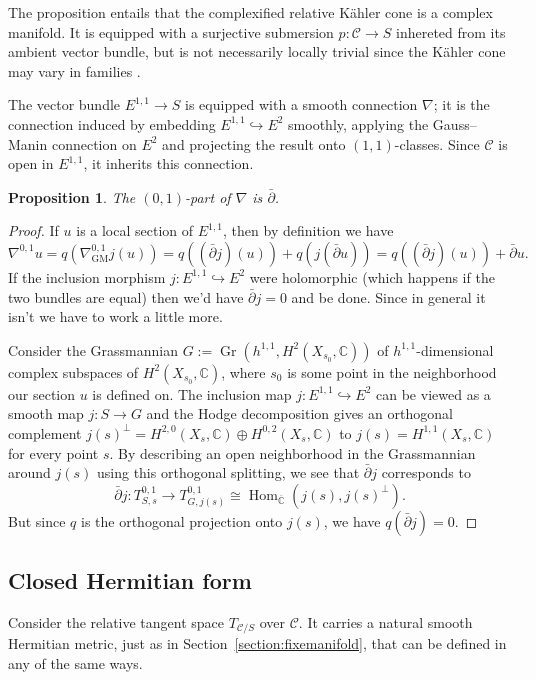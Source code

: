 \documentclass[11pt,a4paper]{amsart}
\newtheorem{prop}[theo]{Proposition}
\theoremstyle{definition}
\theoremstyle{remark}
\newcommand{\CC}{\mathbb{C}}
\def\ov#1{\overline{#1}}
\DeclareMathOperator{\Gr}{Gr}
\DeclareMathOperator{\Hom}{Hom}
\def\dbar{\bar\partial}
\def\conn{\nabla}
\def\conngm{\nabla_{\mathrm{GM}}}
\def\KC{C}
\def\RKC{\mathcal{\KC}}
\begin{document}
The proposition entails that the complexified relative K\"{a}hler cone is
a complex manifold. It is equipped with a surjective submersion $p :
\RKC \to S$ inhereted from its ambient vector bundle, but is not
necessarily locally trivial since the K\"{a}hler cone may vary in
families
\cite{DemaillyPaun}.


The vector bundle $E^{1,1} \to S$ is equipped with a smooth connection
$\conn$; it is the connection induced by embedding $E^{1,1}
\hookrightarrow E^2$ smoothly, applying the Gauss--Manin connection on
$E^2$ and projecting the result onto $(1,1)$-classes. Since $\RKC$
is open in $E^{1,1}$, it inherits this connection.


\begin{prop}
The $(0,1)$-part of $\conn$ is $\dbar$.
\end{prop}


\begin{proof}
If $u$ is a local section of $E^{1,1}$, then by definition we have
$$
\conn^{0,1} u = q (\conngm^{0,1} j(u))
= q ((\dbar j) (u))
+ q (j(\dbar u))
= q ((\dbar j) (u))
+ \dbar u. 
$$
If the inclusion morphism $j : E^{1,1} \hookrightarrow E^2$ were
holomorphic (which happens if the two bundles are equal) then we'd have
$\dbar j = 0$ and be done.  Since in general it isn't we have to
work a little more.

Consider the Grassmannian $G := \Gr(h^{1,1}, H^2(X_{s_0},\CC))$ of
$h^{1,1}$-dimensional complex subspaces of $H^2(X_{s_0},\CC)$, where
$s_0$ is some point in the neighborhood our section $u$ is defined on.
The inclusion map $j : E^{1,1} \hookrightarrow E^2$ can be viewed as a
smooth map $j : S \to G$ and the Hodge decomposition gives an orthogonal
complement $j(s)^{\perp} = H^{2,0}(X_s, \CC) \oplus H^{0,2}(X_s, \CC)$ to
$j(s) = H^{1,1}(X_s, \CC)$ for every point $s$. By describing an open
neighborhood in the Grassmannian around $j(s)$ using this orthogonal
splitting, we see that $\dbar j$ corresponds to
$$
\dbar j : T_{S,s}^{0,1}
\to 
T_{G, j(s)}^{0,1}
\cong
\Hom_{\ov{\CC}}(j(s), j(s)^{\perp}).
$$
But since $q$ is the orthogonal projection onto $j(s)$, we have
$q(\dbar j) = 0$.
\end{proof}


\subsection*{Closed Hermitian form}

Consider the relative tangent space $T_{\RKC/S}$ over $\RKC$. It carries
a natural smooth Hermitian metric, just as in
Section~\ref{section:fixemanifold}, that can be defined in any of the
same ways.
\end{document}
